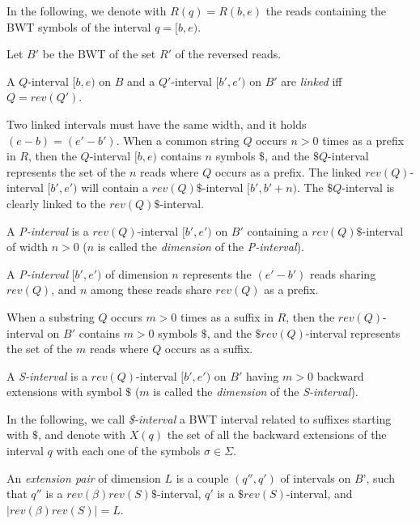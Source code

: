 \documentclass[11pt]{article}
\begin{document}
In the following, we denote with $R(q)=R(b,e)$ the reads containing the BWT symbols of the interval $q=[b,e)$.

Let $B'$ be the BWT of the set $R'$ of the reversed reads.

\begin{definition}
A $Q$-interval $[b,e)$ on $B$ and a $Q'$-interval $[b',e')$ on $B'$ are \emph{linked} iff $Q=rev(Q')$. 
\end{definition}

Two linked intervals must have the same width, and it holds $(e-b)=(e'-b')$.
When a common string $Q$ occurs $n>0$ times as a prefix in $R$, then the $Q$-interval $[b,e)$ contains $n$ symbols $\$$, and the $\$ Q$-interval represents the set of the $n$ reads where $Q$ occurs as a prefix. The linked $rev(Q)$-interval $[b',e')$ will contain a $rev(Q)\$$-interval $[b',b'+n)$. The $\$ Q$-interval is clearly linked to the $rev(Q)\$$-interval.

\begin{definition}
A \emph{P-interval} is a $rev(Q)$-interval $[b',e')$ on $B'$ containing a $rev(Q)\$$-interval of width $n>0$ ($n$ is called the \emph{dimension} of the \emph{P-interval}).
\end{definition}

A \emph{P-interval} $[b',e')$ of dimension $n$ represents the $(e'-b')$ reads sharing $rev(Q)$, and $n$ among these reads share $rev(Q)$ as a prefix.

When a substring $Q$ occurs $m>0$ times as a suffix in $R$, then the $rev(Q)$-interval on $B'$ contains $m>0$ symbols $\$$, and the $\$ rev(Q)$-interval represents the set of the $m$ reads where $Q$ occurs as a suffix.

\begin{definition}
A \emph{S-interval} is a $rev(Q)$-interval $[b',e')$ on $B'$ having $m>0$ backward extensions with symbol $\$$  ($m$ is called the \emph{dimension} of the \emph{S-interval}).
\end{definition}

In the following, we call \emph{\$-interval} a BWT interval related to suffixes starting with $\$$, and denote with $X(q)$ the set of all the backward extensions of the interval $q$ with each one of the symbols $\sigma \in \Sigma$.

\begin{definition}
An \emph{extension pair} of dimension $L$ is a couple $(q'', q')$ of intervals on $B’$, such that $q''$ is a $rev(\beta)rev(S)\$$-interval, $q'$ is a $\$rev(S)$-interval,
and $|rev(\beta)rev(S)| = L$.
\end{definition}
\end{document}
